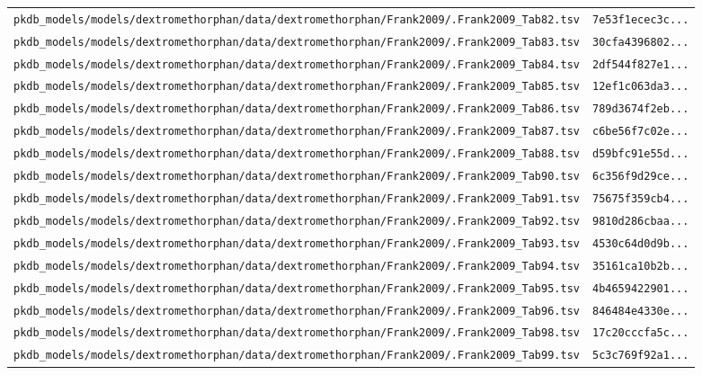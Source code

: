 \begin{longtable}{ll}
\texttt{pkdb\_models/models/dextromethorphan/data/dextromethorphan/Frank2009/.Frank2009\_Tab82.tsv} & \texttt{7e53f1ecec3c...} \\
\texttt{pkdb\_models/models/dextromethorphan/data/dextromethorphan/Frank2009/.Frank2009\_Tab83.tsv} & \texttt{30cfa4396802...} \\
\texttt{pkdb\_models/models/dextromethorphan/data/dextromethorphan/Frank2009/.Frank2009\_Tab84.tsv} & \texttt{2df544f827e1...} \\
\texttt{pkdb\_models/models/dextromethorphan/data/dextromethorphan/Frank2009/.Frank2009\_Tab85.tsv} & \texttt{12ef1c063da3...} \\
\texttt{pkdb\_models/models/dextromethorphan/data/dextromethorphan/Frank2009/.Frank2009\_Tab86.tsv} & \texttt{789d3674f2eb...} \\
\texttt{pkdb\_models/models/dextromethorphan/data/dextromethorphan/Frank2009/.Frank2009\_Tab87.tsv} & \texttt{c6be56f7c02e...} \\
\texttt{pkdb\_models/models/dextromethorphan/data/dextromethorphan/Frank2009/.Frank2009\_Tab88.tsv} & \texttt{d59bfc91e55d...} \\
\texttt{pkdb\_models/models/dextromethorphan/data/dextromethorphan/Frank2009/.Frank2009\_Tab90.tsv} & \texttt{6c356f9d29ce...} \\
\texttt{pkdb\_models/models/dextromethorphan/data/dextromethorphan/Frank2009/.Frank2009\_Tab91.tsv} & \texttt{75675f359cb4...} \\
\texttt{pkdb\_models/models/dextromethorphan/data/dextromethorphan/Frank2009/.Frank2009\_Tab92.tsv} & \texttt{9810d286cbaa...} \\
\texttt{pkdb\_models/models/dextromethorphan/data/dextromethorphan/Frank2009/.Frank2009\_Tab93.tsv} & \texttt{4530c64d0d9b...} \\
\texttt{pkdb\_models/models/dextromethorphan/data/dextromethorphan/Frank2009/.Frank2009\_Tab94.tsv} & \texttt{35161ca10b2b...} \\
\texttt{pkdb\_models/models/dextromethorphan/data/dextromethorphan/Frank2009/.Frank2009\_Tab95.tsv} & \texttt{4b4659422901...} \\
\texttt{pkdb\_models/models/dextromethorphan/data/dextromethorphan/Frank2009/.Frank2009\_Tab96.tsv} & \texttt{846484e4330e...} \\
\texttt{pkdb\_models/models/dextromethorphan/data/dextromethorphan/Frank2009/.Frank2009\_Tab98.tsv} & \texttt{17c20cccfa5c...} \\
\texttt{pkdb\_models/models/dextromethorphan/data/dextromethorphan/Frank2009/.Frank2009\_Tab99.tsv} & \texttt{5c3c769f92a1...} \\

\end{longtable}

